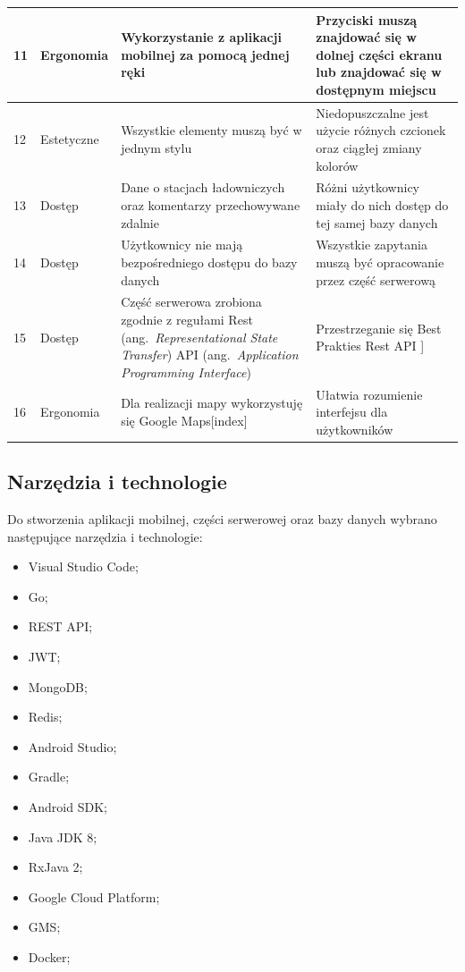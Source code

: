 \begin{table}[htb]
\begin{tabularx}{\linewidth}{| l| l |X | X |}
    \hline
    11 & Ergonomia & Wykorzystanie z aplikacji mobilnej za pomocą jednej ręki & Przyciski muszą znajdować się w dolnej części ekranu lub znajdować się w dostępnym miejscu \\
    \hline
    12 & Estetyczne & Wszystkie elementy muszą być w jednym stylu & Niedopuszczalne jest użycie różnych czcionek oraz ciągłej zmiany kolorów \\
    \hline
    13 & Dostęp & Dane o stacjach ładowniczych oraz komentarzy przechowywane zdalnie & Różni użytkownicy miały do nich dostęp do tej samej bazy danych \\
    \hline
    14 & Dostęp & Użytkownicy nie mają bezpośredniego dostępu do bazy danych & Wszystkie zapytania muszą być opracowanie przez część serwerową \\
    \hline
    15 & Dostęp & Część serwerowa zrobiona zgodnie z regułami Rest (ang.~\emph{Representational State Transfer}) API (ang.~\emph{Application Programming Interface}) & Przestrzeganie się Best Prakties Rest API \cite{rest_api_best}] \\
    \hline
    16 & Ergonomia & Dla realizacji mapy wykorzystuję się Google Maps[index] & Ułatwia rozumienie interfejsu dla użytkowników \\
    \hline
\end{tabularx}
\end{table}
\newpage
\subsection{Narzędzia i technologie}
Do stworzenia aplikacji mobilnej, części serwerowej oraz bazy danych wybrano następujące narzędzia i technologie:
\begin{multicols}{3}
\begin{itemize}
    \item Visual Studio Code;
    \item Go;
    \item REST API;
    \item JWT;
    \item MongoDB;
    \item Redis;
    \item Android Studio;
    \item Gradle;
    \item Android SDK;
    \item Java JDK 8;
    \item RxJava 2;
    \item Google Cloud Platform;
    \item GMS;
    \item Docker;
\end{itemize}
\end{multicols}


